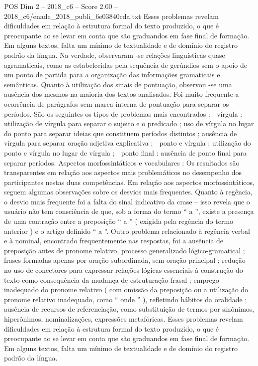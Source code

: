\begin{textsample}{POS Dim 2 – 2018\_c6 – Score 2.00 – 2018\_c6/enade\_2018\_publi\_6e03840cda.txt}
Esses problemas revelam dificuldades em relação à estrutura formal do texto produzido, o que é preocupante ao se levar em conta que são graduandos em fase final de formação.
Em alguns textos, falta um mínimo de textualidade e de domínio do registro padrão da língua.
Na verdade, observaram -se relações linguísticas quase agramaticais, como as estabelecidas pela sequência de gerúndios sem o apoio de um ponto de partida para a organização das informações gramaticais e semânticas.
Quanto à utilização dos sinais de pontuação, observou -se uma ausência dos mesmos na maioria dos textos analisados.
Foi muito frequente a ocorrência de parágrafos sem marca interna de pontuação para separar os períodos.
São os seguintes os tipos de problemas mais encontrados :  vírgula : utilização de vírgula para separar o sujeito e o predicado ; uso de vírgula no lugar do ponto para separar ideias que constituem períodos distintos ; ausência de vírgula para separar oração adjetiva explicativa ;  ponto e vírgula : utilização do ponto e vírgula no lugar de vírgula ;  ponto final : ausência de ponto final para separar períodos.
Aspectos morfossintáticos e vocabulares : Os resultados são transparentes em relação aos aspectos mais problemáticos no desempenho dos participantes nestas duas competências.
Em relação aos aspectos morfossintáticos, seguem algumas observações sobre os desvios mais frequentes.
Quanto à regência, o desvio mais frequente foi a falta do sinal indicativo da crase – isso revela que o usuário não tem consciência de que, sob a forma do termo “ a ”, existe a presença de uma contração entre a preposição “ a ” ( exigida pela regência do termo anterior ) e o artigo definido “ a ”.
Outro problema relacionado à regência verbal e à nominal, encontrado frequentemente nas respostas, foi a ausência de preposição antes de pronome relativo, processo generalizado lógico-gramatical ; frases formadas apenas por oração subordinada, sem oração principal ; redução no uso de conectores para expressar relações lógicas essenciais à construção do texto como consequência da mudança de estruturação frasal ; emprego inadequado do pronome relativo ( com omissão da preposição ou a utilização do pronome relativo inadequado, como “ onde ” ), refletindo hábitos da oralidade ; ausência de recursos de referenciação, como substituição de termos por sinônimos, hiperônimos, nominalizações, expressões metafóricas.
Esses problemas revelam dificuldades em relação à estrutura formal do texto produzido, o que é preocupante ao se levar em conta que são graduandos em fase final de formação.
Em alguns textos, falta um mínimo de textualidade e de domínio do registro padrão da língua.

\end{textsample}

